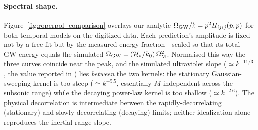 \documentclass[10pt,prd,aps,nobibnotes,superscriptaddress,preprintnumbers,notitlepage]{revtex4-1}
\begin{document}
\paragraph{Spectral shape.} Figure~\ref{fig:roperpol_comparison} overlays our analytic
$\Omega_{\rm GW}/k=p^2H_{ijij}(p,p)$ for both temporal models on the digitized data.
Each prediction's amplitude is fixed not by a free fit but by the measured energy
fraction---scaled so that its total GW energy equals the simulated
$\Omega_{\rm GW}=(\mathcal H_\ast/k_0)\,\Omega_{\rm M}^2$. Normalised this way the three
curves coincide near the peak, and the simulated ultraviolet slope ($\simeq k^{-11/3}$,
the value reported in \cite{RoperPol:2019wvy}) lies \emph{between} the two kernels: the
stationary Gaussian-sweeping kernel is too steep ($\simeq k^{-5.5}$, essentially
$M$-independent across the subsonic range) while the decaying power-law kernel is too
shallow ($\simeq k^{-2.6}$). The physical decorrelation is intermediate between the
rapidly-decorrelating (stationary) and slowly-decorrelating (decaying) limits; neither
idealization alone reproduces the inertial-range slope.
\end{document}
